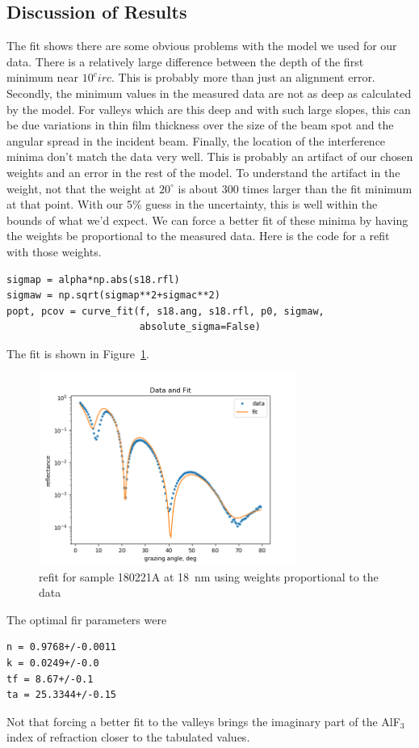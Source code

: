 \documentclass[english]{scrartcl}
\begin{document}
\subsection{Discussion of Results}
The fit shows there are some obvious problems with the model we used
for our data. There is a relatively large difference between the depth of
the first minimum near $10^circ$. This is probably more than just an alignment
error. Secondly, the minimum values in the measured data are not as deep
as calculated by the model. For valleys which are this deep and with such
large slopes, this can be due variations in thin film thickness over the
size of the beam spot and the angular spread in the incident beam.
Finally, the location of the interference minima don't match the data
very well. This is probably an artifact of our chosen weights and an
error in the rest of the model. To understand the artifact in the weight,
not that the weight at $20^\circ$ is about 300 times larger than the
fit minimum at that point. With our 5\% guess in the uncertainty, this
is well within the bounds of what we'd expect. We can force a better fit
of these minima by having the weights be proportional to the 
measured data. Here is the code for a refit with those weights.
\begin{lstlisting}
sigmap = alpha*np.abs(s18.rfl)
sigmaw = np.sqrt(sigmap**2+sigmac**2)
popt, pcov = curve_fit(f, s18.ang, s18.rfl, p0, sigmaw,
                       absolute_sigma=False)
\end{lstlisting}
The fit is shown in Figure~\ref{fig:fit18a}.
\begin{figure}[htb]
  \begin{center}
    \includegraphics[width=0.75\textwidth]{images/fit18a}
  \end{center}
  \caption{\label{fig:fit18a}refit for sample 180221A at 18~nm using
  weights proportional to the data}
\end{figure}
The optimal fir parameters were
\begin{lstlisting}
n = 0.9768+/-0.0011
k = 0.0249+/-0.0
tf = 8.67+/-0.1
ta = 25.3344+/-0.15
\end{lstlisting}
Not that forcing a better fit to the valleys brings the imaginary
part of the AlF$_3$ index of refraction closer to the tabulated
values.
\end{document}
